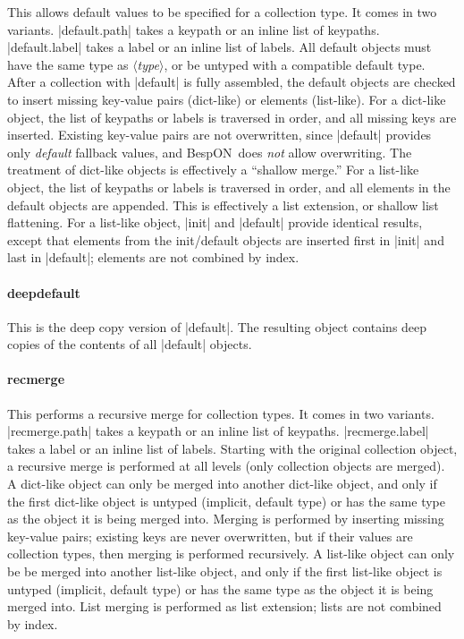 \documentclass[11pt]{article}
\newcommand{\bespon}{BespON}
\newcommand{\vmeta}[1]{{\color{DarkRed}\ensuremath{\langle}\textit{#1}\ensuremath{\rangle}}}
\begin{document}
{{This allows default values to be specified for a collection type.  It comes in two variants. |default.path| takes a keypath or an inline list of keypaths.  |default.label| takes a label or an inline list of labels.  All default objects must have the same type as \vmeta{type}, or be untyped with a compatible default type.  After a collection with |default| is fully assembled, the default objects are checked to insert missing key-value pairs (dict-like) or elements (list-like).  For a dict-like object, the list of keypaths or labels is traversed in order, and all missing keys are inserted.  Existing key-value pairs are not overwritten, since |default| provides only \emph{default} fallback values, and \bespon\ does \emph{not} allow overwriting.  The treatment of dict-like objects is effectively a ``shallow merge.''  For a list-like object, the list of keypaths or labels is traversed in order, and all elements in the default objects are appended.  This is effectively a list extension, or shallow list flattening.  For a list-like object, |init| and |default| provide identical results, except that elements from the init/default objects are inserted first in |init| and last in |default|; elements are not combined by index.


\paragraph{deepdefault}

This is the deep copy version of |default|.  The resulting object contains deep copies of the contents of all |default| objects.


\paragraph{recmerge}

This performs a recursive merge for collection types.  It comes in two variants. |recmerge.path| takes a keypath or an inline list of keypaths.  |recmerge.label| takes a label or an inline list of labels.  Starting with the original collection object, a recursive merge is performed at all levels (only collection objects are merged).  A dict-like object can only be merged into another dict-like object, and only if the first dict-like object is untyped (implicit, default type) or has the same type as the object it is being merged into.  Merging is performed by inserting missing key-value pairs; existing keys are never overwritten, but if their values are collection types, then merging is performed recursively.  A list-like object can only be be merged into another list-like object, and only if the first list-like object is untyped (implicit, default type) or has the same type as the object it is being merged into.  List merging is performed as list extension; lists are not combined by index.

}}
\end{document}
